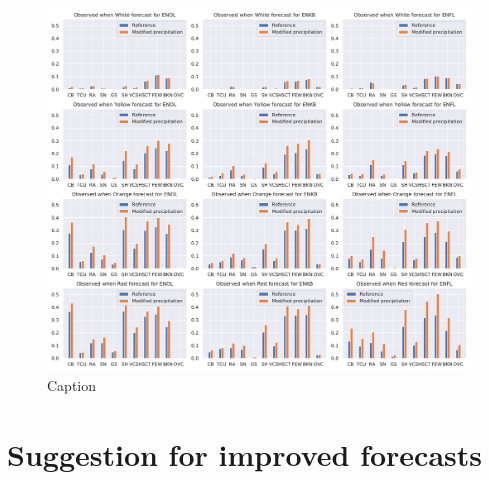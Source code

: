 \begin{figure}
    \centering
    \includegraphics[width=\textwidth]{Figures/HTIMetar2.pdf}
    \caption{Caption}
    \label{fig:HTIMETAR2}
\end{figure}


\section{Suggestion for improved forecasts}

